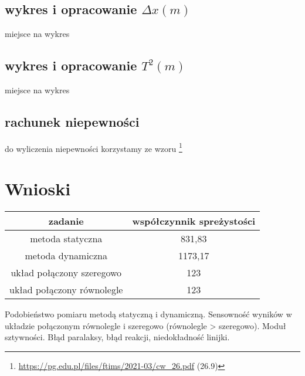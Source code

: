 \documentclass{article}
\begin{document}
\subsection{wykres i opracowanie $\Delta x(m)$}
miejsce na wykres

\subsection{wykres i opracowanie $T^2(m)$}
miejsce na wykres

\subsection{rachunek niepewności}
do wyliczenia niepewności korzystamy ze wzoru \footnote{\url{https://pg.edu.pl/files/ftims/2021-03/cw_26.pdf} (26.9)}


\section{Wnioski}

\begin{center}
\begin{tabular}{ c | c }
zadanie & współczynnik spreżystości  \\

\hline
 metoda statyczna  & 831,83\\  
 metoda dynamiczna & 1173,17 \\
 układ połączony szeregowo & 123 \\
 układ połączony równolegle & 123 
\end{tabular}
\end{center}

Podobieństwo pomiaru metodą statyczną i dynamiczną.
Sensowność wyników w układzie połączonym równolegle i szeregowo (równolegle > szeregowo).
Moduł sztywności.
Błąd paralaksy, błąd reakcji, niedokładność linijki.
\end{document}
